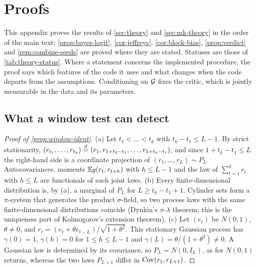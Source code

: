 \section{Proofs}\label{app:proofs}

This appendix proves the results of \cref{sec:theory} and \cref{sec:mk-theory} in the order of
the main text; \cref{prop:bayes-logit}, \cref{cor:jeffreys}, \cref{cor:block-bias},
\cref{prop:verdict} and \cref{rem:combine-seeds} are proved where they are stated. Statuses are those of
\cref{tab:theory-status}. Where a statement concerns the implemented procedure, the proof says
which features of the code it uses and what changes when the code departs from the assumptions.
Conditioning on $\mathcal{G}$ fixes the critic, which is jointly measurable in the data and its
parameters.

\subsection{What a window test can detect}\label{app:proofs-windows}

\begin{proof}[Proof of \cref{prop:window-ident}]
(a) Let $t_1<\dots<t_k$ with $t_k-t_1\le L-1$. By strict stationarity,
$(r_{t_1},\dots,r_{t_k})\overset{d}{=}(r_1,r_{1+t_2-t_1},\dots,r_{1+t_k-t_1})$, and since $1+t_k-t_1\le L$
the right-hand side is a coordinate projection of $(r_1,\dots,r_L)\sim P_L$. Autocovariances,
moments $\mathbb{E} g(r_t,r_{t+h})$ with $h\le L-1$ and the law of $\sum_{t=1}^hr_t$ with $h\le L$ are
functionals of such joint laws.
(b) Every finite-dimensional distribution is, by (a), a marginal of $P_L$ for $L\ge t_k-t_1+1$.
Cylinder sets form a $\pi$-system that generates the product $\sigma$-field, so two process laws
with the same finite-dimensional distributions coincide (Dynkin's $\pi$-$\lambda$ theorem; this
is the uniqueness part of Kolmogorov's extension theorem).
(c) Let $(e_t)$ be \iid{} $N(0,1)$, $\theta\neq0$, and $r_t=(e_t+\theta e_{t-L})/\sqrt{1+\theta^2}$.
This stationary Gaussian process has $\gamma(0)=1$, $\gamma(h)=0$ for $1\le h\le L-1$ and
$\gamma(L)=\theta/(1+\theta^2)\neq0$. A Gaussian law is determined by its covariance, so
$P_L=N(0,I_L)$, as for \iid{} $N(0,1)$ returns, whereas the two laws $P_{L+1}$ differ in
$\operatorname{Cov}(r_1,r_{L+1})$.
\end{proof}


